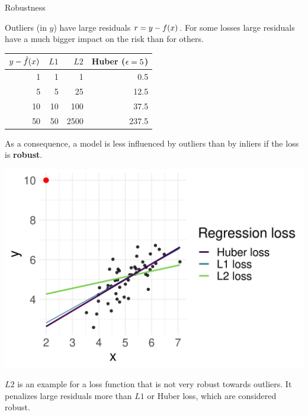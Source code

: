 
\begin{vbframe}{Robustness}

\small

Outliers (in $y$) have large residuals $r = y - f(x)$. For some losses large 
residuals have a much bigger impact on the risk than for others. 

\vspace{0.5cm}

\begin{minipage}[c]{0.55\textwidth}
  \footnotesize
  \begin{table}[]
  \begin{tabular}{r|r|r|r}
  \toprule
  $y - \hat{f}(x)$ & $L1$ & $L2$ & Huber ($\epsilon = 5$) \\ \hline
  1 & 1 & 1 & 0.5 \\
  5 & 5 & 25 & 12.5 \\
  10 & 10 & 100 & 37.5 \\
  50 & 50 & 2500  & 237.5
\end{tabular}
\end{table}
\end{minipage}%
\begin{minipage}[c]{0.05\textwidth}
  \phantom{foo}
\end{minipage}%
\begin{minipage}[c]{0.4\textwidth}
  \small
  As a consequence, a model is less influenced by outliers than by inliers if 
  the loss is \textbf{robust}.
\end{minipage}%

\vfill

\begin{minipage}[c]{0.55\textwidth}
  \includegraphics[width=\textwidth]{figure/robustness}
  \footnotesize \centering
\end{minipage}%
\begin{minipage}[c]{0.05\textwidth}
  \phantom{foo}
\end{minipage}%
\begin{minipage}[c]{0.4\textwidth}
  \small \raggedright
  $L2$ is an example for a loss function that is not very robust towards
  outliers. It penalizes large residuals more than $L1$ or Huber loss, which are
  considered robust.
\end{minipage}%


\end{vbframe}
